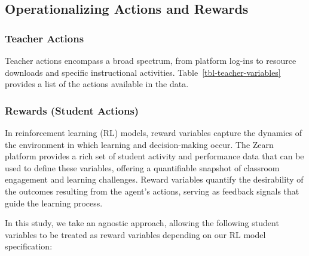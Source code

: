 \documentclass[
  number,
  preprint,
  3p,
  onecolumn]{elsarticle}
\begin{document}
\subsection{Operationalizing Actions and
Rewards}\label{operationalizing-actions-and-rewards}

\subsubsection{Teacher Actions}\label{teacher-actions}

Teacher actions encompass a broad spectrum, from platform log-ins to
resource downloads and specific instructional activities.
Table~\ref{tbl-teacher-variables} provides a list of the actions
available in the data.

\subsubsection{Rewards (Student Actions)}\label{rewards-student-actions}

In reinforcement learning (RL) models, reward variables capture the
dynamics of the environment in which learning and decision-making occur.
The Zearn platform provides a rich set of student activity and
performance data that can be used to define these variables, offering a
quantifiable snapshot of classroom engagement and learning challenges.
Reward variables quantify the desirability of the outcomes resulting
from the agent's actions, serving as feedback signals that guide the
learning process.

In this study, we take an agnostic approach, allowing the following
student variables to be treated as reward variables depending on our RL
model specification:
\end{document}

